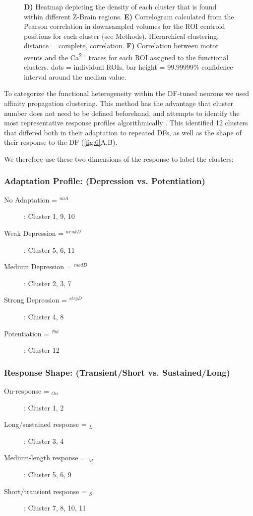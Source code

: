 \documentclass[9pt,lineno]{RandlettLab_elife}
\begin{document}
\begin{figure}
\begin{fullwidth}
\begin{center}
{\textbf{D)} Heatmap depicting the density of each cluster that is found within different Z-Brain regions. 
\textbf{E)} Correlogram calculated from the Pearson correlation in downsampled volumes for the ROI centroid positions for each cluster (see Methods). Hierarchical clustering, distance = complete, correlation. 
\textbf{F)} Correlation between motor events and the Ca\textsuperscript{2+} traces for each ROI assigned to the functional clusters. dots = individual ROIs, bar height = 99.99999\% confidence interval around the median value. 
}
\label{fig:6}
\end{center}
\end{fullwidth}
\end{figure}

To categorize the functional heterogeneity within the DF-tuned neurons we used affinity propagation clustering. This method has the advantage that cluster number does not need to be defined beforehand, and attempts to identify the most representative response profiles algorithmically \cite{Forster2020-lg}.  This identified 12 clusters that differed both in their adaptation to repeated DFs, as well as the shape of their response to the DF (\autoref{fig:6}A,B). 

We therefore use these two dimensions of the response to label the clusters:

\subsubsection{Adaptation Profile:  (Depression vs. Potentiation)}


\begin{description}
\item[No Adaptation = $^{noA}$ ]    : 	Cluster 1, 9, 10
\item[Weak Depression = $^{weakD}$ ]    : 	Cluster 5, 6, 11
\item[Medium Depression = $^{medD}$ ]    : 	Cluster 2, 3, 7
\item[Strong Depression = $^{strgD}$ ]    : 	Cluster 4, 8
\item[Potentiation = $^{Pot}$ ]    : 	Cluster 12
\end{description}



\subsubsection{Response Shape: (Transient/Short vs. Sustained/Long)}
\begin{description}
\item[On-response = $_{On}$]    : 	Cluster 1, 2
\item[Long/sustained response = $_{L}$]    : 	Cluster 3, 4
\item[Medium-length response = $_{M}$]    : 	Cluster 5, 6, 9
\item[Short/transient response = $_{S}$]    : 	Cluster 7, 8, 10, 11

\end{description}
\\
\end{document}
